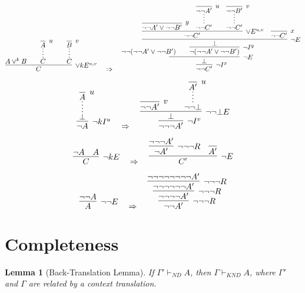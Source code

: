 \documentclass{article}
\newtheorem{lemma}{Lemma}
\begin{document}
\vspace{3em}
\[
\infer[\lor kE^{u,v}]{C}{
    A \lor^k B
    \hspace{2em}
    \infer*[]{C}{\infer[u]{A}{}}
    \hspace{2em}
    \infer*[]{C}{\infer[v]{B}{}}
}
\quad\Rightarrow\quad
\infer[\neg I^x]{\neg\neg C'}{
  \infer[\neg E]{\perp}{
    \neg\neg (\neg\neg A' \lor \neg\neg B') \hspace{-5em}
    \infer[\neg I^y]{\neg (\neg\neg A' \lor \neg\neg B')}{
      \infer[\neg E]{\perp}{
        \infer[\lor E^{u,v}]{\neg\neg C'}{
          {\infer[y]{\neg\neg A' \lor \neg\neg B'}{}} \hspace{1em}
          \infer*[]{\neg\neg C'}{\infer[u]{\neg\neg A'}{}}
          \hspace{1em}
          \infer*[]{\neg\neg C'}{\infer[v]{\neg\neg B'}{}}
        }
        \hspace{1em}
        {\infer[x]{\neg\neg C'}{}}
      }
    }
  }
}
\]

\vspace{3em}
\[
\infer[\neg kI^u]{\neg A}{
  \infer*[]{\bot}{\infer[u]{A}{}}
}
\quad \Rightarrow \quad
\infer[\neg I^v]{\neg\neg\neg A'}{
  \infer[\neg\neg\bot E]{\bot}{
    \infer[v]{\neg\neg A'}{}
    \hspace{2em}
    \infer*[]{\neg\neg\bot}{\infer[u]{A'}{}}
  }
}
\]

\vspace{3em}
\[
\infer[\neg kE]{C}{
  \neg A \quad A
}
\quad \Rightarrow \quad
\infer[\neg E]{C'}{
    \infer[\neg\neg\neg R]{\neg A'}{
      \neg\neg\neg A'
    }
  \quad
  \infer{A'}{}
}
\]



\vspace{3em}
\[
\infer[\neg\neg E]{A}{
    \neg\neg A
}
\quad \Rightarrow \quad
\infer[\neg\neg\neg R]{
  \neg\neg A'
}{
  \infer[\neg\neg\neg R]{
    \neg\neg\neg\neg A'
  }{
    \infer[\neg\neg\neg R]{
      \neg\neg\neg\neg\neg\neg A'
    }{
      \neg\neg\neg\neg\neg\neg\neg\neg A'
    }
  }
}
\]











\section{Completeness}
    \begin{lemma}[Back-Translation Lemma]
    If \(\Gamma' \vdash_{\textit{ND}} A\), then \(\Gamma \vdash_{\textit{KND}} A\), where \(\Gamma'\) and \(\Gamma\) are related by a context translation.
    \end{lemma}
    
\end{document}
